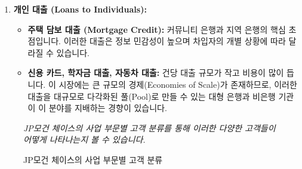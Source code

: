 \documentclass[11pt,a4paper]{book}
\theoremstyle{definition}
\begin{document}
\begin{enumerate}
    \item \textbf{개인 대출 (Loans to Individuals):}
    \begin{itemize}
        \item \textbf{주택 담보 대출 (Mortgage Credit):} 커뮤니티 은행과 지역 은행의 핵심 초점입니다. 이러한 대출은 정보 민감성이 높으며 차입자의 개별 상황에 따라 달라질 수 있습니다.
        \item \textbf{신용 카드, 학자금 대출, 자동차 대출:} 건당 대출 규모가 작고 비용이 많이 듭니다. 이 시장에는 큰 규모의 경제(Economies of Scale)가 존재하므로, 이러한 대출을 대규모로 다각화된 풀(Pool)로 만들 수 있는 대형 은행과 비은행 기관이 이 분야를 지배하는 경향이 있습니다.
    \end{itemize}
\end{enumerate}

\begin{figure}[h!]
    \centering
    \caption{JP모건 체이스의 사업 부문별 고객 분류}
    \label{fig:jpmorgan_segments}
    \textit{JP모건 체이스의 사업 부문별 고객 분류를 통해 이러한 다양한 고객들이 어떻게 나타나는지 볼 수 있습니다.}
\end{figure}
\end{document}
